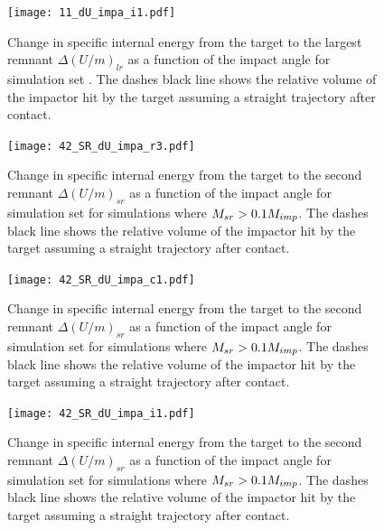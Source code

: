 {\begin{landscape}
\begin{figure}
\begin{center}
\texttt{[image: 11\_dU\_impa\_i1.pdf]}
\caption{Change in specific internal energy from the target to the largest remnant $\Delta (U / m )_{lr}$ as a function of the impact angle for simulation set \iss. The dashes black line shows the relative volume of the impactor hit by the target assuming a straight trajectory after contact.}
\label{ch03_fig11c}
\end{center}
\end{figure}

\begin{figure}
\begin{center}
\texttt{[image: 42\_SR\_dU\_impa\_r3.pdf]}
\caption{Change in specific internal energy from the target to the second remnant $\Delta (U / m )_{sr}$ as a function of the impact angle for simulation set \rss for simulations where $M_{sr}  > 0.1 M_{imp}$. The dashes black line shows the relative volume of the impactor hit by the target assuming a straight trajectory after contact.}
\label{ch03_fig42a}
\end{center}
\end{figure}

\begin{figure}
\begin{center}
\texttt{[image: 42\_SR\_dU\_impa\_c1.pdf]}
\caption{Change in specific internal energy from the target to the second remnant $\Delta (U / m )_{sr}$ as a function of the impact angle for simulation set \css for simulations where $M_{sr}  > 0.1 M_{imp}$. The dashes black line shows the relative volume of the impactor hit by the target assuming a straight trajectory after contact.}
\label{ch03_fig42b}
\end{center}
\end{figure}

\begin{figure}
\begin{center}
\texttt{[image: 42\_SR\_dU\_impa\_i1.pdf]}
\caption{Change in specific internal energy from the target to the second remnant $\Delta (U / m )_{sr}$ as a function of the impact angle for simulation set \iss for simulations where $M_{sr}  > 0.1 M_{imp}$. The dashes black line shows the relative volume of the impactor hit by the target assuming a straight trajectory after contact.}
\label{ch03_fig42c}
\end{center}
\end{figure}
\end{landscape}
}



